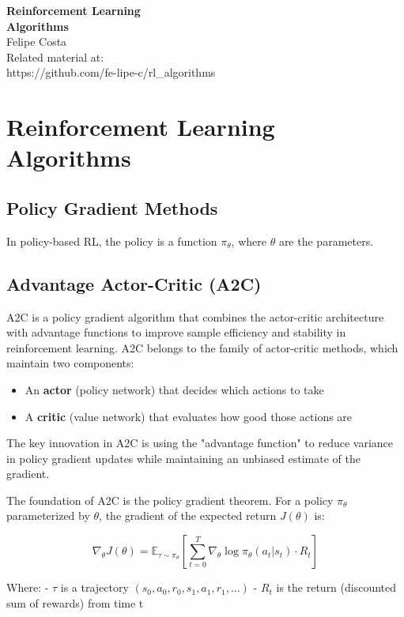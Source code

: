 \documentclass[12pt]{article}
\newcommand{\DOI}{https://github.com/fe-lipe-c/rl\_algorithms}
\begin{document}
\begin{titlepage}
	\begin{flushright}
		\LARGE{\textbf{Reinforcement Learning}}\\
		\vfill
		\Huge{\textbf{Algorithms}}\\
		\vfill
		\large Felipe Costa\\
		\vfill
		\normalsize Related material at:\\
		\DOI
		\vfill
	\end{flushright}
\end{titlepage}


\pagebreak

\section*{Reinforcement Learning Algorithms}

\subsection*{Policy Gradient Methods}

In policy-based RL, the policy is a function $\pi_{\theta}$, where $\theta$ are the parameters.\cite{szepesvari2019algos}

\subsection*{Advantage Actor-Critic (A2C)}

A2C is a policy gradient algorithm that combines the actor-critic architecture with advantage functions to improve sample efficiency and stability in reinforcement learning. A2C belongs to the family of actor-critic methods, which maintain two components:

\begin{itemize}
  \item An \textbf{actor} (policy network) that decides which actions to take
  \item A \textbf{critic} (value network) that evaluates how good those actions are
\end{itemize}

The key innovation in A2C is using the "advantage function" to reduce variance in policy gradient updates while maintaining an unbiased estimate of the gradient.

The foundation of A2C is the policy gradient theorem. For a policy $\pi_{\theta}$ parameterized by $\theta$, the gradient of the expected return $J(\theta)$ is:

\begin{equation}
	\nabla_\theta J(\theta) = \mathbb{E}_{\tau \sim \pi_\theta} \left[ \sum_{t=0}^{T} \nabla_\theta \log \pi_\theta(a_t|s_t) \cdot R_t \right]
\end{equation}

Where:
- $\tau$ is a trajectory $(s_0, a_0, r_0, s_1, a_1, r_1, \dots)$
- $R_{t}$ is the return (discounted sum of rewards) from time t


\pagebreak
\printbibliography
\end{document}
